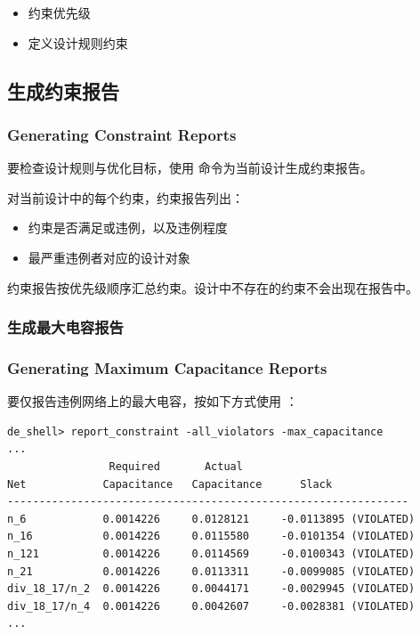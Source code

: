 \begin{seeAlsoBox}
\begin{itemize}
  \item 约束优先级
  \item 定义设计规则约束
\end{itemize}
\end{seeAlsoBox}

\subsection{生成约束报告}
\subsubsection*{Generating Constraint Reports}

要检查设计规则与优化目标，使用  命令为当前设计生成约束报告。

对当前设计中的每个约束，约束报告列出：
\begin{itemize}
  \item 约束是否满足或违例，以及违例程度
  \item 最严重违例者对应的设计对象
\end{itemize}

约束报告按优先级顺序汇总约束。设计中不存在的约束不会出现在报告中。

\subsubsection{生成最大电容报告}
\subsubsection*{Generating Maximum Capacitance Reports}

要仅报告违例网络上的最大电容，按如下方式使用 ：
\begin{lstlisting}
de_shell> report_constraint -all_violators -max_capacitance
...
                Required       Actual
Net            Capacitance   Capacitance      Slack
---------------------------------------------------------------
n_6            0.0014226     0.0128121     -0.0113895 (VIOLATED)
n_16           0.0014226     0.0115580     -0.0101354 (VIOLATED)
n_121          0.0014226     0.0114569     -0.0100343 (VIOLATED)
n_21           0.0014226     0.0113311     -0.0099085 (VIOLATED)
div_18_17/n_2  0.0014226     0.0044171     -0.0029945 (VIOLATED)
div_18_17/n_4  0.0014226     0.0042607     -0.0028381 (VIOLATED)
...
\end{lstlisting}

